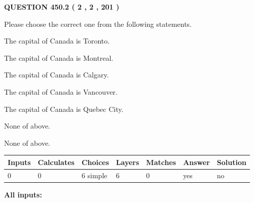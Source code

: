\documentclass[12pt]{article}
\begin{document}
   
  
\vspace{0.2in}
  
{\textbf{\Large{QUESTION
450.2 
 ( 2 , 2 , 201 )
}}}
  
  
Please choose the correct one from the following statements.
 
 
The capital of Canada is Toronto.
 
 
The capital of Canada is Montreal.
 
 
The capital of Canada is Calgary.
 
 
The capital of Canada is Vancouver.
 
 
The capital of Canada is Quebec City.
 
 
 None of above.
 
 
\noindent{}
 
 
 None of above.
 
 
\noindent{}
 
 
   
   
   
   
\noindent\begin{tabular}{|l|l|l|l|l|l|l|}
 \hline
Inputs & Calculates & Choices & Layers & Matches & Answer & Solution \\ \hline
 0  & 
 0  & 
 6
  simple  
  & 
 6  & 
 0  & 
  yes & 
  no 
  \\ \hline
 \end{tabular}
   
   
   
   
\noindent{}
   
   
   
   
\noindent\vspace{0.1in}\hspace{-0.08in} {\textbf{\Large{All inputs: }}}
   
   
   
   
   
   
 \vspace{0.2in}
 
   
   
\end{document}
